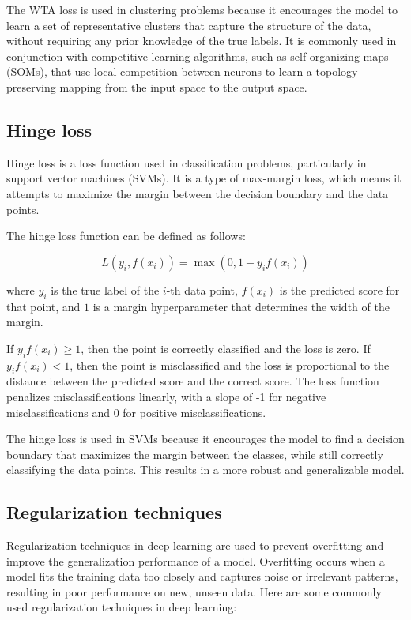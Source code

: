 The WTA loss is used in clustering problems because it encourages the model to learn a set of representative clusters that capture the structure of the data, without requiring any prior knowledge of the true labels. It is commonly used in conjunction with competitive learning algorithms, such as self-organizing maps (SOMs), that use local competition between neurons to learn a topology-preserving mapping from the input space to the output space.

\subsection{Hinge loss}
\label{subsec:3_hinge_loss}

Hinge loss is a loss function used in classification problems, particularly in support vector machines (SVMs). It is a type of max-margin loss, which means it attempts to maximize the margin between the decision boundary and the data points.

The hinge loss function can be defined as follows:

\begin{equation}
	L(y_i, f(x_i)) = \max(0, 1 - y_i f(x_i))
\end{equation}

where $y_i$ is the true label of the $i$-th data point, $f(x_i)$ is the predicted score for that point, and $1$ is a margin hyperparameter that determines the width of the margin.

If $y_i f(x_i) \geq 1$, then the point is correctly classified and the loss is zero. If $y_i f(x_i) < 1$, then the point is misclassified and the loss is proportional to the distance between the predicted score and the correct score. The loss function penalizes misclassifications linearly, with a slope of -1 for negative misclassifications and 0 for positive misclassifications.

The hinge loss is used in SVMs because it encourages the model to find a decision boundary that maximizes the margin between the classes, while still correctly classifying the data points. This results in a more robust and generalizable model.

\subsection{Regularization techniques}
\label{subsec:3_regularization}

Regularization techniques in deep learning are used to prevent overfitting and improve the generalization performance of a model. Overfitting occurs when a model fits the training data too closely and captures noise or irrelevant patterns, resulting in poor performance on new, unseen data. Here are some commonly used regularization techniques in deep learning:

